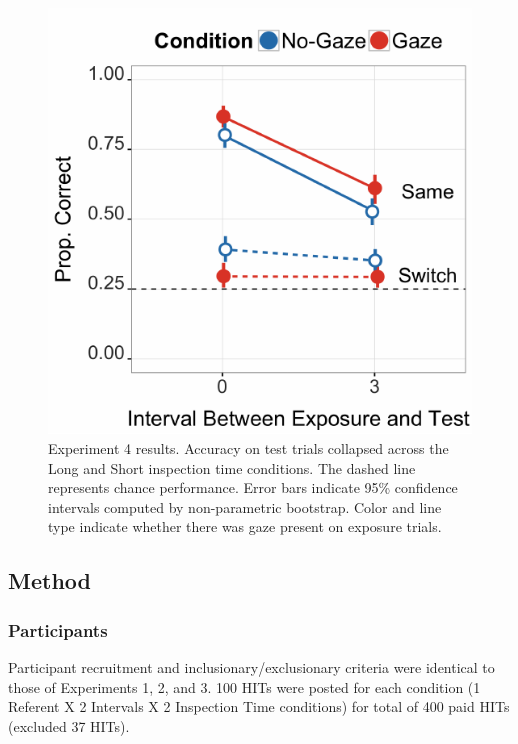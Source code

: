 \documentclass[authoryear, review]{elsarticle}
\newenvironment{CodeChunk}{}{}
\begin{document}
\begin{CodeChunk}
\begin{figure}[tb]
\includegraphics{figs/expt4-plot-1} \caption[Experiment 4 results]{Experiment 4 results. Accuracy on test trials collapsed across the Long and Short inspection time conditions. The dashed line represents chance performance. Error bars indicate 95\% confidence intervals computed by non-parametric bootstrap. Color and line type indicate whether there was gaze present on exposure trials.}\label{fig:expt4-plot}
\end{figure}
\end{CodeChunk}

\subsection{Method}\label{method-3}

\subsubsection{Participants}\label{participants-3}

Participant recruitment and inclusionary/exclusionary criteria were
identical to those of Experiments 1, 2, and 3. 100 HITs were posted for
each condition (1 Referent X 2 Intervals X 2 Inspection Time conditions)
for total of 400 paid HITs (excluded 37 HITs).
\end{document}
